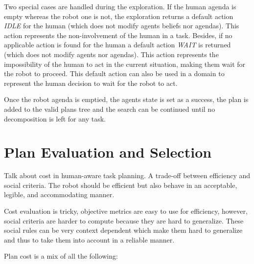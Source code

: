 Two special cases are handled during the exploration. If the human agenda is empty whereas the robot one is not, the exploration returns a default action \textit{IDLE} for the human (which does not modify agents beliefs nor agendas). This action represents the non-involvement of the human in a task. Besides, if no applicable action is found for the human a default action \textit{WAIT} is returned (which does not modify agents nor agendas). This action represents the impossibility of the human to act in the current situation, making them wait for the robot to proceed. This default action can also be used in a domain to represent the human decision to wait for the robot to act.

Once the robot agenda is emptied, the agents state is set as a success, the plan is added to the valid plans tree and the search can be continued until no decomposition is left for any task.


\section{Plan Evaluation and Selection}

Talk about cost in human-aware task planning. A trade-off between efficiency and social criteria. The robot should be efficient but also behave in an acceptable, legible, and accommodating manner.  


Cost evaluation is tricky, objective metrics are easy to use for efficiency, however, social criteria are harder to compute because they are hard to generalize. These social rules can be very context dependent which make them hard to generalize and thus to take them into account in a reliable manner.

Plan cost is a mix of all the following:

